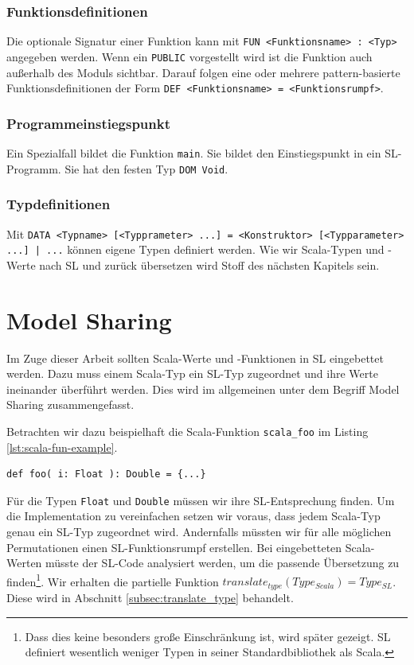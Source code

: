 \documentclass[12pt,bibtotoc]{scrreprt}
\begin{document}
\subsection{Funktionsdefinitionen}

Die optionale Signatur einer Funktion kann mit \lstinline!FUN <Funktionsname> : <Typ>! angegeben werden. Wenn ein \lstinline!PUBLIC! vorgestellt wird ist die Funktion auch außerhalb des Moduls sichtbar. Darauf folgen eine oder mehrere pattern-basierte Funktionsdefinitionen der Form \lstinline!DEF <Funktionsname> = <Funktionsrumpf>!.


\subsection{Programmeinstiegspunkt}

Ein Spezialfall bildet die Funktion \lstinline!main!. Sie bildet den Einstiegspunkt in ein SL-Programm. Sie hat den festen Typ \lstinline!DOM Void!. 

\subsection{Typdefinitionen}

Mit \lstinline!DATA <Typname> [<Typprameter> ...] = <Konstruktor> [<Typparameter> ...] | ...! können eigene Typen definiert werden. Wie wir Scala-Typen und -Werte nach SL und zurück übersetzen wird Stoff des nächsten Kapitels sein.

\chapter{Model Sharing}
\label{cha:model-sharing}

Im Zuge dieser Arbeit sollten Scala-Werte und -Funktionen in SL eingebettet werden. Dazu muss einem Scala-Typ ein SL-Typ zugeordnet und ihre Werte ineinander überführt werden. Dies wird im allgemeinen unter dem Begriff Model Sharing zusammengefasst.

Betrachten wir dazu beispielhaft die Scala-Funktion \lstinline!scala_foo! im Listing \ref{lst:scala-fun-example}.

\begin{lstlisting}[caption=Beispielfunktion scala\_foo, label=lst:scala-fun-example]
def foo( i: Float ): Double = {...}
\end{lstlisting}

Für die Typen \lstinline!Float! und \lstinline!Double! müssen wir ihre SL-Entsprechung finden. Um die Implementation zu vereinfachen setzen wir voraus, dass jedem Scala-Typ genau ein SL-Typ zugeordnet wird. Andernfalls müssten wir für alle möglichen Permutationen einen SL-Funktionsrumpf erstellen. Bei eingebetteten Scala-Werten müsste der SL-Code analysiert werden, um die passende Übersetzung zu finden\footnote{Dass dies keine besonders große Einschränkung ist, wird später gezeigt. SL definiert wesentlich weniger Typen in seiner Standardbibliothek als Scala. }. Wir erhalten die partielle Funktion $translate_{type}(Type_{Scala}) = Type_{SL}$. Diese wird in Abschnitt \ref{subsec:translate_type} behandelt.
\end{document}
